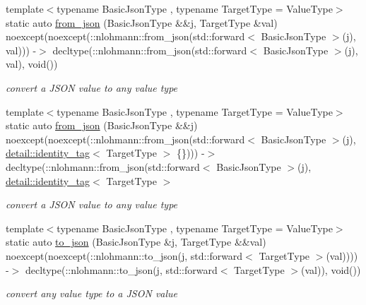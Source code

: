 \begin{DoxyCompactItemize}
\item 
{\footnotesize template$<$typename Basic\+Json\+Type , typename Target\+Type  = Value\+Type$>$ }\\static auto \hyperlink{structnlohmann_1_1adl__serializer_a8180f52bf21fc610705bc521f22116ae}{from\+\_\+json} (Basic\+Json\+Type \&\&j, Target\+Type \&val) noexcept(noexcept(\+::nlohmann\+::from\+\_\+json(std\+::forward$<$ Basic\+Json\+Type $>$(j), val))) -\/$>$ decltype(\+::nlohmann\+::from\+\_\+json(std\+::forward$<$ Basic\+Json\+Type $>$(j), val), void())
\begin{DoxyCompactList}\small\item\em convert a J\+S\+ON value to any value type \end{DoxyCompactList}\item 
{\footnotesize template$<$typename Basic\+Json\+Type , typename Target\+Type  = Value\+Type$>$ }\\static auto \hyperlink{structnlohmann_1_1adl__serializer_a95eddeff6ff0dd0b6b11c4c7a526716d}{from\+\_\+json} (Basic\+Json\+Type \&\&j) noexcept(noexcept(\+::nlohmann\+::from\+\_\+json(std\+::forward$<$ Basic\+Json\+Type $>$(j), \hyperlink{structnlohmann_1_1detail_1_1identity__tag}{detail\+::identity\+\_\+tag}$<$ Target\+Type $>$ \{\}))) -\/$>$ decltype(\+::nlohmann\+::from\+\_\+json(std\+::forward$<$ Basic\+Json\+Type $>$(j), \hyperlink{structnlohmann_1_1detail_1_1identity__tag}{detail\+::identity\+\_\+tag}$<$ Target\+Type $>$
\begin{DoxyCompactList}\small\item\em convert a J\+S\+ON value to any value type \end{DoxyCompactList}\item 
{\footnotesize template$<$typename Basic\+Json\+Type , typename Target\+Type  = Value\+Type$>$ }\\static auto \hyperlink{structnlohmann_1_1adl__serializer_afdcc8f0204ce8ac7d28a5403f6e1f0e7}{to\+\_\+json} (Basic\+Json\+Type \&j, Target\+Type \&\&val) noexcept(noexcept(\+::nlohmann\+::to\+\_\+json(j, std\+::forward$<$ Target\+Type $>$(val)))) -\/$>$ decltype(\+::nlohmann\+::to\+\_\+json(j, std\+::forward$<$ Target\+Type $>$(val)), void())
\begin{DoxyCompactList}\small\item\em convert any value type to a J\+S\+ON value \end{DoxyCompactList}\end{DoxyCompactItemize}



